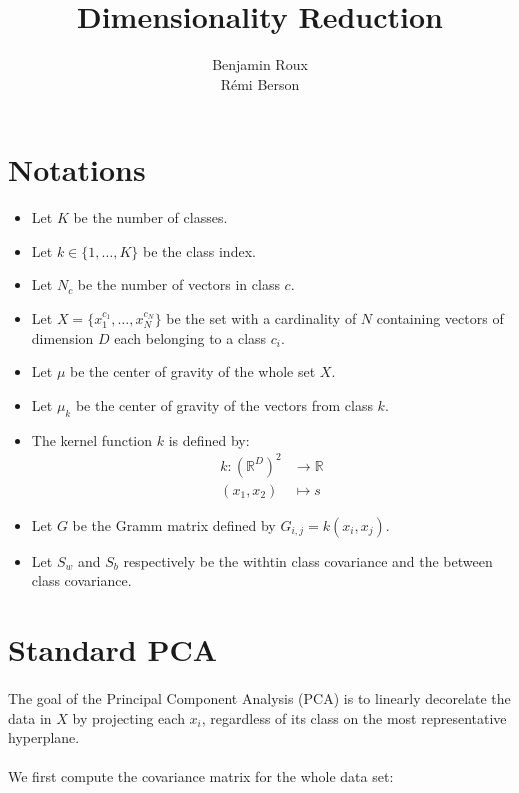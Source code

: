 \documentclass[a4paper]{article}
\title{Dimensionality Reduction}
\author{Benjamin Roux \\ Rémi Berson}
\date{}
\begin{document}
\maketitle

\section*{Notations}

\begin{itemize}
  \item Let $K$ be the number of classes.
  \item Let $k \in \{1, \ldots, K\}$ be the class index. 
  \item Let $N_c$ be the number of vectors in class $c$.
  \item Let $X = \{x^{c_1}_1, \ldots, x^{c_N}_N\}$ be the set with a cardinality of $N$ containing vectors of dimension $D$ each belonging to a class $c_i$.
  \item Let $\mu$ be the center of gravity of the whole set $X$.
  \item Let $\mu_k$ be the center of gravity of the vectors from class $k$.
  \item The kernel function $k$ is defined by:
  	\begin{align*}
   		k : \left(\mathbb{R}^D\right)^2 &\to \mathbb{R}\\
   		(x_1, x_2) &\mapsto s 
   	\end{align*}
  \item Let $G$ be the Gramm matrix defined by $G_{i,j} = k(x_i, x_j)$.
  \item Let $S_w$ and $S_b$ respectively be the withtin class covariance and the between class covariance. 
\end{itemize}



\section*{Standard PCA}

\paragraph{}
The goal of the Principal Component Analysis (PCA) is to linearly decorelate the data in $X$ by projecting each $x_i$, regardless of its class on the most representative hyperplane.

\paragraph{}
We first compute the covariance matrix for the whole data set:
\end{document}

